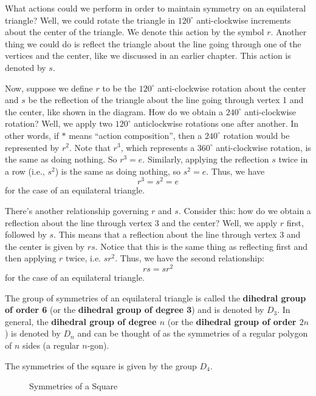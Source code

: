 What actions could we perform in order to maintain symmetry on an equilateral triangle? Well, we could rotate the triangle in $120^\circ$ anti-clockwise increments about the center of the triangle. We denote this action by the symbol $r$. Another thing we could do is reflect the triangle about the line going through one of the vertices and the center, like we discussed in an earlier chapter. This action is denoted by $s$.

Now, suppose we define $r$ to be the $120^\circ$ anti-clockwise rotation about the center and $s$ be the reflection of the triangle about the line going through vertex 1 and the center, like shown in the diagram. How do we obtain a $240^\circ$ anti-clockwise rotation? Well, we apply two $120^\circ$ anticlockwise rotations one after another. In other words, if $\ast$ means ``action composition'', then a $240^\circ$ rotation would be represented by $r^2$. Note that $r^3$, which represents a $360^\circ$ anti-clockwise rotation, is the same as doing nothing. So $r^3 = e$. Similarly, applying the reflection $s$ twice in a row (i.e., $s^2$) is the same as doing nothing, so $s^2 = e$. Thus, we have
\[
    r^3 = s^2 = e
\]
for the case of an equilateral triangle.

There's another relationship governing $r$ and $s$. Consider this: how do we obtain a reflection about the line through vertex 3 and the center? Well, we apply $r$ first, followed by $s$. This means that a reflection about the line through vertex 3 and the center is given by $rs$. Notice that this is the same thing as reflecting first and then applying $r$ twice, i.e. $sr^2$. Thus, we have the second relationship:
\[
    rs = sr^2
\]
for the case of an equilateral triangle.

The group of symmetries of an equilateral triangle is called the \textbf{dihedral group of order 6} (or the \textbf{dihedral group of degree 3}) and is denoted by $D_3$. In general, the \textbf{dihedral group of degree $n$} (or the \textbf{dihedral group of order $2n$}) is denoted by $D_n$ and can be thought of as the symmetries of a regular polygon of $n$ sides (a regular $n$-gon).

\begin{example}
    The symmetries of the square is given by the group $D_4$.
\end{example}
\begin{figure}[h]
    \centering
    \caption{Symmetries of a Square}
\end{figure}

